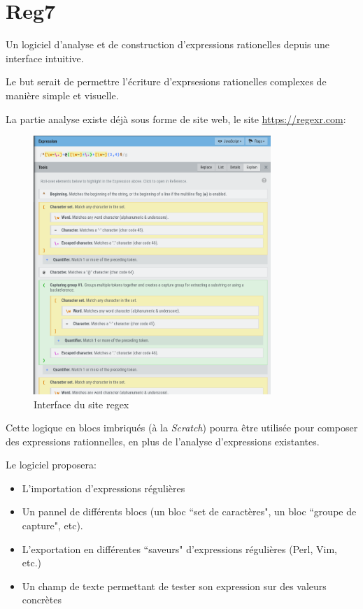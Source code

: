 \documentclass{article}
\begin{document}
\newpage

\section{Reg7}

Un logiciel d'analyse et de construction d'expressions rationelles depuis une interface intuitive.

Le but serait de permettre l'écriture d'exprsesions rationelles complexes de manière simple et visuelle.

La partie analyse existe déjà sous forme de site web, le site \url{https://regexr.com}:

\begin{figure}[H]
    \centering
    \includegraphics[width=0.8\textwidth]{regexr.com.png}
    \caption{Interface du site regex}
    \label{fig:reg7:regexr}
\end{figure}

Cette logique en blocs imbriqués (à la \emph{Scratch}) pourra être utilisée pour composer des expressions rationnelles, en plus de l'analyse d'expressions existantes.

Le logiciel proposera:

\begin{itemize}
    \item L'importation d'expressions régulières
    \item Un pannel de différents blocs (un bloc ``set de caractères", un bloc ``groupe de capture", etc).
    \item L'exportation en différentes ``saveurs" d'expressions régulières (Perl, Vim, etc.) 
    \item Un champ de texte permettant de tester son expression sur des valeurs concrètes
\end{itemize}
\end{document}
